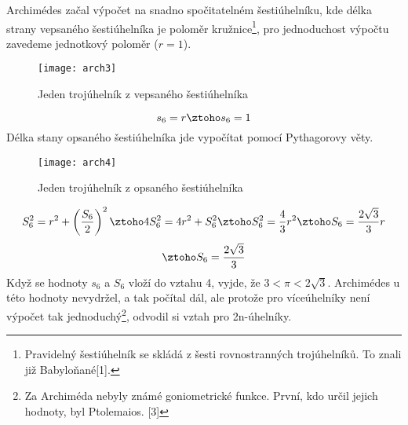 \documentclass[soc]{gzwroc} %
\begin{document}
Archimédes začal výpočet na snadno spočitatelném šestiúhelníku, kde délka strany vepsaného šestiúhelníka je poloměr kružnice\footnote[6]{Pravidelný šestiúhelník se skládá z šesti rovnostranných trojúhelníků. To znali již Babyloňané[1].}, pro jednoduchost výpočtu zavedeme jednotkový poloměr ($r=1$).
\begin{figure}[!ht]
\texttt{[image: arch3]}
\caption{Jeden trojúhelník z vepsaného šestiúhelníka}
\label{fig:kruh}
\end{figure}
$$
s_6=r \ztoho s_6=1
$$
Délka stany opsaného šestiúhelníka jde vypočítat pomocí Pythagorovy věty.
\begin{figure}[!ht]
\texttt{[image: arch4]}
\caption{Jeden trojúhelník z opsaného šestiúhelníka}
\label{fig:kruh}
\end{figure}
$$ S_6^2=r^2+\left(\frac{S_6}{2}\right)^2 \ztoho 4S_6^2=4r^2+S_6^2 \ztoho S_6^2=\frac{4}{3}r^2 \ztoho S_6=\frac{2\sqrt{3}}{3}r $$
$$
\ztoho S_6=\frac{2\sqrt{3}}{3}
$$
Když se hodnoty $s_6$ a $S_6$ vloží do vztahu 4, vyjde, že $3<\pi <2\sqrt{3}$. Archimédes u této hodnoty nevydržel, a tak počítal dál, ale protože pro víceúhelníky není výpočet tak jednoduchý\footnote[7]{Za Archiméda nebyly známé goniometrické funkce. První, kdo určil jejich hodnoty, byl Ptolemaios. [3]}, odvodil si vztah pro 2n-úhelníky.
\end{document}
